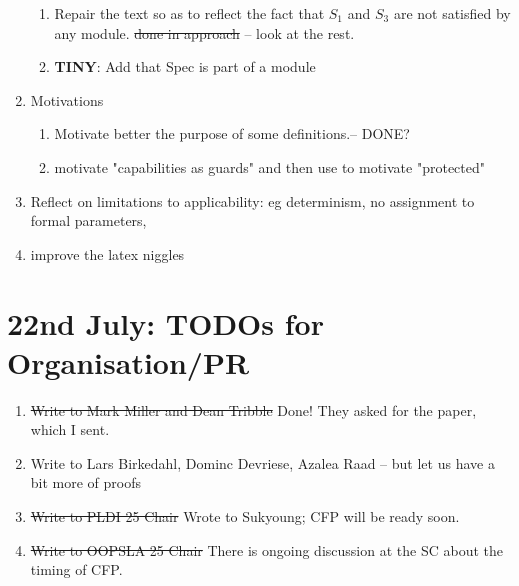 \documentclass[acmsmall,review,anonymous]{acmart}\settopmatter{printfolios=true}
\begin{document}
\begin{enumerate}
\begin{enumerate}
\item
Repair the text so as to reflect the fact that $S_1$ and $S_3$ are not satisfied by any module. {\st{done in approach}} -- look at the rest.

\item
\textbf{TINY}:  Add that Spec is part of a module

 \end{enumerate}

\item
Motivations 

\begin{enumerate}
\item
Motivate better the purpose of some definitions.-- 
DONE? 
\item
motivate "capabilities as guards" and then use to motivate "protected"
\end{enumerate}
 
\item
Reflect on limitations to applicability: eg determinism, no assignment to formal parameters, 



\item
improve the latex niggles 
 


\end{enumerate}

\section{22nd  July: TODOs for Organisation/PR}

 
\begin{enumerate}
\item
\st{Write to Mark Miller and Dean Tribble} Done! They asked for the paper, which I sent.
\item
Write to Lars Birkedahl, Dominc Devriese, Azalea Raad -- but let us have a bit more of proofs
\item
\st{Write to PLDI 25 Chair} Wrote to Sukyoung; CFP will be ready soon.
\item
\st{Write to OOPSLA 25 Chair} There is ongoing discussion at the SC about the timing of CFP.

\end{enumerate}

 
\end{document}
